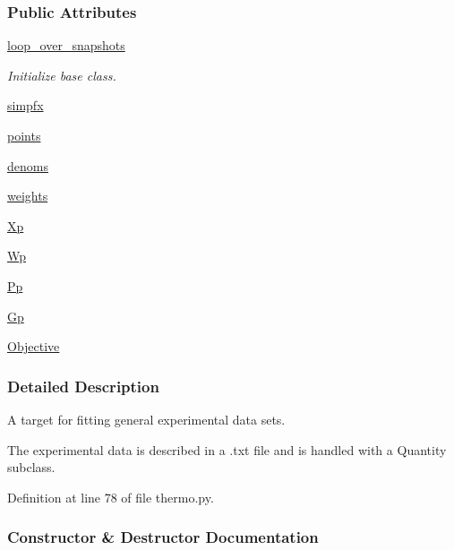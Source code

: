 \subsubsection*{Public Attributes}
\begin{DoxyCompactItemize}
\item 
\hyperlink{classsrc_1_1thermo_1_1Thermo_ae0461d1a1ad33e619a2e8e6a9f73d0ff}{loop\+\_\+over\+\_\+snapshots}
\begin{DoxyCompactList}\small\item\em Initialize base class. \end{DoxyCompactList}\item 
\hyperlink{classsrc_1_1thermo_1_1Thermo_ab263fe1ce27b50dfb10922320be6b1f5}{simpfx}
\item 
\hyperlink{classsrc_1_1thermo_1_1Thermo_aaeeea9d4ee23f01a929279f33988bb9b}{points}
\item 
\hyperlink{classsrc_1_1thermo_1_1Thermo_a52da57ea1927e6d0b9d32d8a65f619a3}{denoms}
\item 
\hyperlink{classsrc_1_1thermo_1_1Thermo_a3570c94b3f8e6e1fb5305039371fcbfa}{weights}
\item 
\hyperlink{classsrc_1_1thermo_1_1Thermo_af0cdfb1c8688ee0d65b87abac5e0dfef}{Xp}
\item 
\hyperlink{classsrc_1_1thermo_1_1Thermo_a366d44a8261e5331ff81bdf16753e58f}{Wp}
\item 
\hyperlink{classsrc_1_1thermo_1_1Thermo_a7d023681679021dd5c7718c10c0f8066}{Pp}
\item 
\hyperlink{classsrc_1_1thermo_1_1Thermo_a84596cc2780296226be18d9df3d28c65}{Gp}
\item 
\hyperlink{classsrc_1_1thermo_1_1Thermo_a001e7b98ef31162bd4708c8cc5a4d9b7}{Objective}
\end{DoxyCompactItemize}


\subsubsection{Detailed Description}
A target for fitting general experimental data sets. 

The experimental data is described in a .txt file and is handled with a {\ttfamily Quantity} subclass. 

Definition at line 78 of file thermo.\+py.



\subsubsection{Constructor \& Destructor Documentation}
\mbox{\label{classsrc_1_1thermo_1_1Thermo_a3278db2b6681f25efdd8185c9d2ac4fe}} 
